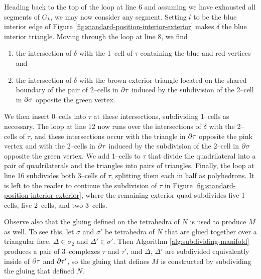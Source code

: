 Heading back to the top of the loop at line 6 and assuming we have exhausted all segments of $G_k$, we may now consider any segment.
Setting $l$ to be the blue interior edge of Figure \ref{fig:standard-position-interior-exterior} makes $\delta$ the blue interior triangle.
Moving through the loop at line 8, we find
\begin{enumerate}
	\item the intersection of $\delta$ with the 1--cell of $\tau$ containing the blue and red vertices and 
	\item the intersection of $\delta$ with the brown exterior triangle located on the shared boundary of the pair of 2--cells in $\partial\tau$ induced by the subdivision of the 2--cell in $\partial\sigma$ opposite the green vertex.
\end{enumerate}
We then insert 0--cells into $\tau$ at these intersections, subdividing 1--cells as necessary.
The loop at line 12 now runs over the intersections of $\delta$ with the 2--cells of $\tau$, and these intersections occur with the triangle in $\partial\tau$ opposite the pink vertex and with the 2--cells in $\partial\tau$ induced by the subdivision of the 2--cell in $\partial\sigma$ opposite the green vertex.
We add 1--cells to $\tau$ that divide the quadrilateral into a pair of quadrilaterals and the triangles into pairs of triangles.
Finally, the loop at line 16 subdivides both 3--cells of $\tau$, splitting them each in half as polyhedrons.
It is left to the reader to continue the subdivision of $\tau$ in Figure \ref{fig:standard-position-interior-exterior}, where the remaining exterior quad subdivides five 1--cells, five 2--cells, and two 3--cells.

Observe also that the gluing defined on the tetrahedra of $N$ is used to produce $M$ as well.
To see this, let $\sigma$ and $\sigma'$ be tetrahedra of $N$ that are glued together over a triangular face, $\Delta\in\sigma_2$ and $\Delta'\in\sigma'$.
Then Algorithm \ref{alg:subdividing-manifold} produces a pair of 3--complexes $\tau$ and $\tau'$, and $\Delta$, $\Delta'$ are subdivided equivalently inside of $\partial\tau$ and $\partial\tau'$, so the gluing that defines $M$ is constructed by subdividing the gluing that defined $N$.


